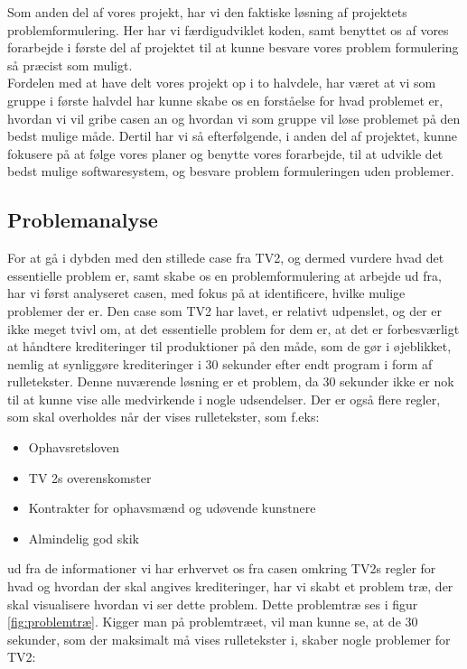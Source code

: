 Som anden del af vores projekt, har vi den faktiske løsning af projektets problemformulering. Her har vi færdigudviklet koden, samt benyttet os af vores forarbejde i første del af projektet til at kunne besvare vores problem formulering så præcist som muligt.\\
Fordelen med at have delt vores projekt op i to halvdele, har været at vi som gruppe i første halvdel har kunne skabe os en forståelse for hvad problemet er, hvordan vi vil gribe casen an og hvordan vi som gruppe vil løse problemet på den bedst mulige måde. Dertil har vi så efterfølgende, i anden del af projektet, kunne fokusere på at følge vores planer og benytte vores forarbejde, til at udvikle det bedst mulige softwaresystem, og besvare problem formuleringen uden problemer.

\subsection{Problemanalyse}
For at gå i dybden med den stillede case fra TV2, og dermed vurdere hvad det essentielle problem er, samt skabe os en problemformulering at arbejde ud fra, har vi først analyseret casen, med fokus på at identificere, hvilke mulige problemer der er. Den case som TV2 har lavet, er relativt udpenslet, og der er ikke meget tvivl om, at det essentielle problem for dem er, at det er forbesværligt at håndtere krediteringer til produktioner på den måde, som de gør i øjeblikket, nemlig at synliggøre krediteringer i 30 sekunder efter endt program i form af rulletekster. Denne nuværende løsning er et problem, da 30 sekunder ikke er nok til at kunne vise alle medvirkende i nogle udsendelser. \cite{url_case} Der er også flere regler, som skal overholdes når der vises rulletekster, som f.eks:
\begin{itemize}
    \item Ophavsretsloven
    \item TV 2s overenskomster
    \item Kontrakter for ophavsmænd og udøvende kunstnere
    \item Almindelig god skik
\end{itemize}
ud fra de informationer vi har erhvervet os fra casen omkring TV2s regler for hvad og hvordan der skal angives krediteringer, har vi skabt et problem træ, der skal visualisere hvordan vi ser dette problem. Dette problemtræ ses i figur \ref{fig:problemtræ}. Kigger man på problemtræet, vil man kunne se, at de 30 sekunder, som der maksimalt må vises rulletekster i, skaber nogle problemer for TV2: 

